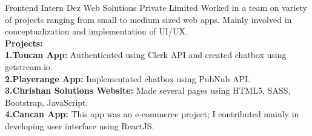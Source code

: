     {Frontend Intern}
    {}
    {Dez Web Solutions Private Limited}
    {}
    {Worked in a team on variety of projects ranging from small to medium sized web apps. Mainly involved in conceptualization and implementation of UI/UX.
    \\ \textbf{Projects:}
    \\ \textbf{1.Toucan App:} Authenticated using Clerk API and created chatbox using getstream.io.
    \\ \textbf{2.Playerange App:} Implementated chatbox using PubNub API.
    \\ \textbf{3.Chrishan Solutions Website:} Made several pages using HTML5, SASS, Bootstrap, JavaScript.
    \\ \textbf{4.Cancan App:} This app was an e-commerce project; I contributed mainly in developing user interface using ReactJS.
    }
    \vspace*{0.2\baselineskip}

